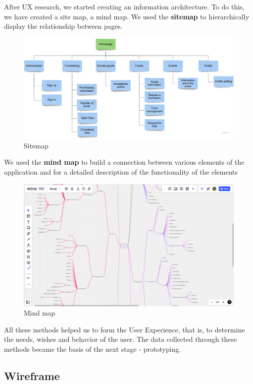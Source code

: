 After UX research, we started creating an information architecture. To do this, we have created a site map, a mind map. We used the \textbf{sitemap} to hierarchically display the relationship between pages.

\begin{figure}[h]
    \centering
    \includegraphics[width=12cm]{figures/userInterface/sitemap.jpg}
    \caption{Sitemap}
    \label{fig:sitemap}
\end{figure}

We used the \textbf{mind map} to build a connection between various elements of the application and
for a detailed description of the functionality of the elements

\begin{figure}[h]
    \centering
    \includegraphics[width=12cm]{figures/userInterface/mindmap.png}
    \caption{Mind map}
    \label{fig:userFlow}
\end{figure}

All these methods helped us to form the User Experience, that is, to determine the needs,
wishes and behavior of the user. The data collected through these methods became the basis of
the next stage - prototyping.

\subsection{Wireframe}

